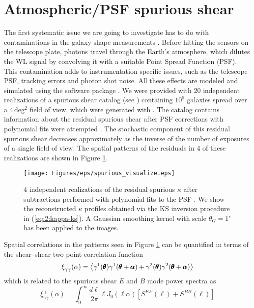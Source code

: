 \section{Atmospheric/PSF spurious shear}
The first systematic issue we are going to investigate has to do with contaminations in the galaxy shape measurements \citep{PetriSpShear}. Before hitting the sensors on the telescope plate, photons travel through the Earth's atmosphere, which dilutes the WL signal by convolving it with a suitable Point Spread Function (PSF). This contamination adds to instrumentation specific issues, such as the telescope PSF, tracking errors and photon shot noise. All these effects are modeled and simulated using the  software package \citep{LSSTOperations}. We were provided with 20 independent realizations of a spurious shear catalog (see \citep{ChangLSST}) containing $10^5$ galaxies spread over a 4\,deg$^2$ field of view, which were generated with . The catalog contains information about the residual spurious shear after PSF corrections with polynomial fits were attempted \citep{ChangLSST}. The stochastic component of this residual spurious shear decreases approximately as the inverse of the number of exposures of a single field of view. The spatial patterns of the residuals in 4 of these realizations are shown in Figure \ref{fig:7:spvisualize}. 
%
\begin{figure}
\begin{center}
\texttt{[image: Figures/eps/spurious\_visualize.eps]}
\end{center}
\caption{4 independent realizations of the residual spurious $\kappa$ after subtractions performed with polynomial fits to the PSF \citep{ChangLSST}. We show the reconstructed $\kappa$ profiles obtained via the KS inversion procedure in (\ref{eq:2:kappa-ks}). A Gaussian smoothing kernel with scale $\theta_G=1'$ has been applied to the images.}
\label{fig:7:spvisualize}
\end{figure}
%
Spatial correlations in the patterns seen in Figure \ref{fig:7:spvisualize} can be quantified in terms of the shear--shear two point correlation function
\begin{equation}
\label{eq:7:shear2pt}
\xi_{\gamma\gamma}^+(\alpha) = \left\langle\gamma^1(\pmb{\theta})\gamma^1(\pmb{\theta}+\pmb{\alpha})+\gamma^2(\pmb{\theta})\gamma^2(\pmb{\theta}+\pmb{\alpha})\right\rangle
\end{equation} 
%
which is related to the spurious shear $E$ and $B$ mode power spectra as 
\begin{equation}
\label{eq:7:shearPow}
\xi_{\gamma\gamma}^+(\alpha) = \int_0^\infty \frac{d\ell}{2\pi}\ell J_0(\ell\alpha)[S^{EE}(\ell)+S^{BB}(\ell)] 
\end{equation}
